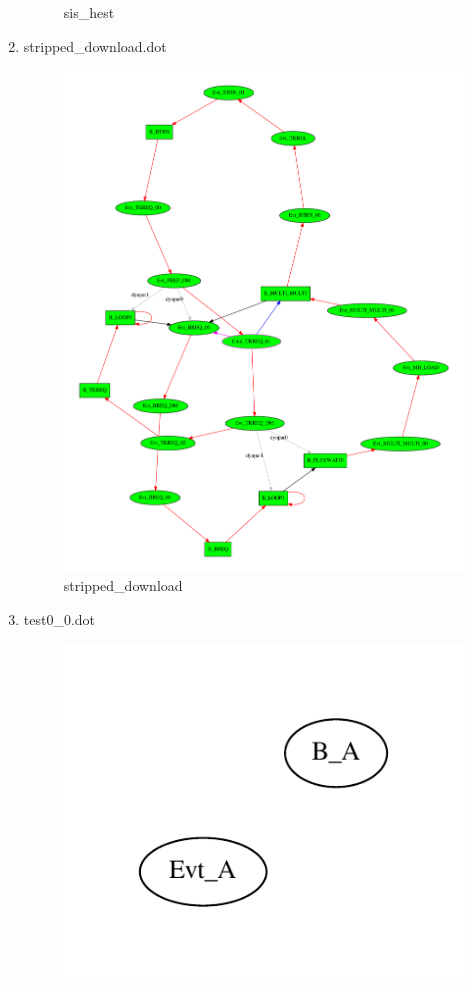 \documentclass[12pt,a4paper]{report}
\begin{document}
\begin{enumerate}
\begin{figure}
        \caption{sis\_hest}
        \label{fig:sis_hest}
    \end{figure}
\item stripped\_download.dot
    \begin{figure}
        \centering 
        \includegraphics*[width=1.0\textwidth,keepaspectratio]{TestPattern/stripped_download.pdf}
        \caption{stripped\_download}
        \label{fig:stripped_download}
    \end{figure}
\item test0\_0.dot
    \begin{figure}
        \centering 
        \includegraphics{TestPattern/test0_0.pdf}

\end{figure}
\end{enumerate}
\end{document}
